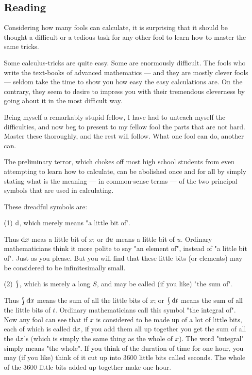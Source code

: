 



\subsection*{Reading}
Considering how many fools can calculate, it is surprising that it should be thought a difficult or
a tedious task for any other fool to learn how to master the same tricks.

Some calculus-tricks are quite easy. Some are enormously difficult. The fools who write the text-books
of advanced mathematics --- and they are mostly clever fools --- seldom take the time to show you how
easy the easy calculations are. On the contrary, they seem to desire to impress you with their tremendous
cleverness by going about it in the most difficult way.

Being myself a remarkably stupid fellow, I have had to unteach myself the difficulties, and now beg
to present to my fellow fool the parts that are not hard. Master these thoroughly, and the rest will
follow. What one fool can do, another can.

The preliminary terror, which chokes off most high school students from even attempting to learn
how to calculate, can be abolished once and for all by simply stating what is the meaning --- in
common-sense terms --- of the two principal symbols that are used in calculating.

These dreadful symbols are:

(1) $ \dif{} $, which merely means "a little bit of".

Thus $ \dif{x} $ meas a little bit of $ x $;
or $ \dif{u} $ means a little bit of $ u $. Ordinary mathematicians think it more polite to say
"an element of", instead of "a little bit of". Just as you please. But you will find that these
little bits (or elements) may be considered to be infinitesimally small.

(2) $ \rint $, which is merely a long $ S $, and may be called (if you like) "the sum of".

Thus $ \rint \dif{x} $ means the sum of all the little bits of $ x $; or $ \rint \dif{t} $ means
the sum of all the little bits of $ t $. Ordinary mathematicians call this symbol "the integral of".
Now any fool can see that if $ x $ is considered to be made up of a lot of little bits, each of
which is called $ \dif{x} $, if you add them all up together you get the sum of all the $ \dif{x}$'s (which
is simply the same thing as the whole of $ x $). The word "integral" simply means "the whole". If you think
of the duration of time for one hour, you may  (if you like) think of it cut up into 3600 little bits
called seconds. The whole of the 3600 little bits added up together make one hour.

